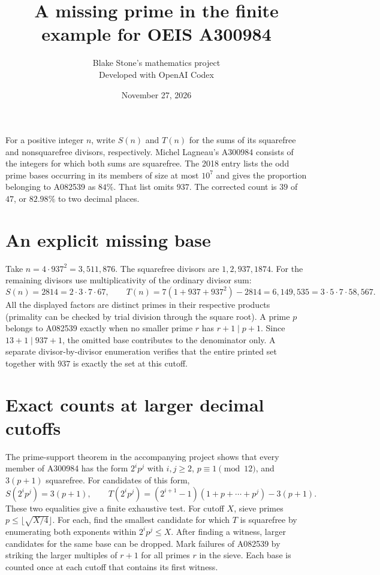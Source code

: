 \documentclass[11pt]{article}
\title{A missing prime in the finite example for OEIS A300984}
\author{Blake Stone's mathematics project\\\small Developed with OpenAI Codex}
\date{November 27, 2026}
\begin{document}
\maketitle
For a positive integer $n$, write $S(n)$ and $T(n)$ for the sums of its
squarefree and nonsquarefree divisors, respectively. Michel Lagneau's A300984
consists of the integers for which both sums are squarefree. The 2018 entry
lists the odd prime bases occurring in its members of size at most $10^7$ and
gives the proportion belonging to A082539 as $84\%$. That list omits $937$.
The corrected count is $39$ of $47$, or $82.98\%$ to two decimal places.

\section*{An explicit missing base}
Take $n=4\cdot937^2=3{,}511{,}876$. The squarefree divisors are $1,2,937,1874$.
For the remaining divisors use multiplicativity of the ordinary divisor sum:
\[
 S(n)=2814=2\cdot3\cdot7\cdot67,\qquad
 T(n)=7(1+937+937^2)-2814=6{,}149{,}535=3\cdot5\cdot7\cdot58{,}567.
\]
All the displayed factors are distinct primes in their respective products
(primality can be checked by trial division through the square root).
A prime $p$ belongs to A082539 exactly when no smaller prime $r$ has
$r+1\mid p+1$. Since $13+1\mid937+1$, the omitted base contributes to the
denominator only. A separate divisor-by-divisor enumeration verifies that the
entire printed set together with $937$ is exactly the set at this cutoff.

\section*{Exact counts at larger decimal cutoffs}
The prime-support theorem in the accompanying project shows that every member
of A300984 has the form $2^i p^j$ with $i,j\ge2$, $p\equiv1\pmod{12}$,
and $3(p+1)$ squarefree. For candidates of this form,
\[
 S(2^i p^j)=3(p+1),\qquad
 T(2^i p^j)=(2^{i+1}-1)(1+p+\cdots+p^j)-3(p+1).
\]
These two equalities give a finite exhaustive test. For cutoff $X$, sieve primes
$p\le\lfloor\sqrt{X/4}\rfloor$. For each, find the smallest candidate for which
$T$ is squarefree by enumerating both exponents within $2^i p^j\le X$.
After finding a witness, larger candidates for the same base can be dropped.
Mark failures of A082539 by striking the larger multiples of $r+1$ for all
primes $r$ in the sieve. Each base is counted once at each cutoff that contains its first witness.
\end{document}
